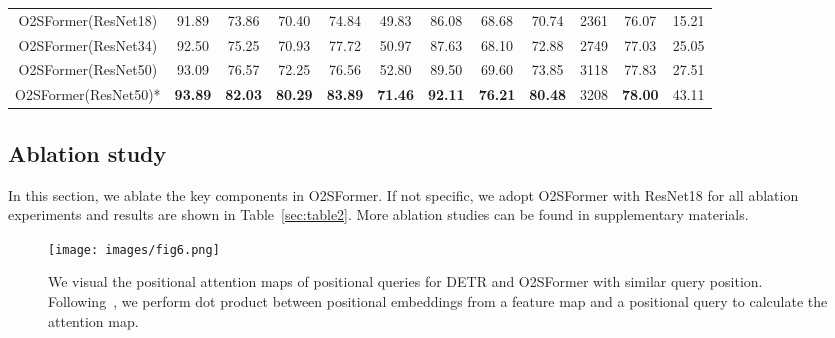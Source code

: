 \documentclass{bmvc2k}
\begin{document}
\begin{table}[!h]
{\begin{tabular}{cccccccccccc}
      \midrule
      O2SFormer(ResNet18)& 91.89& 73.86& 70.40& 74.84& 49.83& 86.08& 68.68& 70.74& 2361& 76.07& 15.21 \\
      O2SFormer(ResNet34)& 92.50& 75.25& 70.93& 77.72& 50.97& 87.63& 68.10& 72.88& 2749& 77.03& 25.05 \\
      O2SFormer(ResNet50)& 93.09& 76.57& 72.25& 76.56& 52.80& 89.50& 69.60& 73.85& 3118& 77.83& 27.51 \\
      O2SFormer(ResNet50)*& {\bf 93.89}& {\bf 82.03}& {\bf 80.29}& {\bf 83.89}& {\bf 71.46}& {\bf 92.11}& {\bf 76.21}& {\bf 80.48}& 3208& {\bf 78.00}& 43.11 \\
      \bottomrule
    \end{tabular}}
    \label{sec:table}
  \end{table}
 
  \subsection{Ablation study}
  In this section, we ablate the key components in O2SFormer. 
  If not specific, we adopt O2SFormer with ResNet18 for all ablation experiments and results are shown in Table~\ref{sec:table2}. 
  More ablation studies can be found in supplementary materials.
  \begin{table}[htbp!]
     \centering
     \caption{Ablation study results of key components of O2SFormer on CULane. FPS is test on a single 2080Ti GPU with TensorRT.}
     \tabcolsep=0.5cm
     \huge
    \label{sec:table2}
   \end{table}
  \begin{figure*}[htbp!]
     \begin{center}
     \texttt{[image: images/fig6.png]}
     \vspace{-0.5cm} 
     \end{center}
        \caption{We visual the positional attention maps of positional queries for DETR and O2SFormer with similar query position. 
                 Following~\cite{liu2022dab}, we perform dot product between positional embeddings from a feature map and a positional 
                 query to calculate the attention map.}
        \vspace{-0.3cm}
     \label{fig:short5}
     \end{figure*}
  
\end{document}
